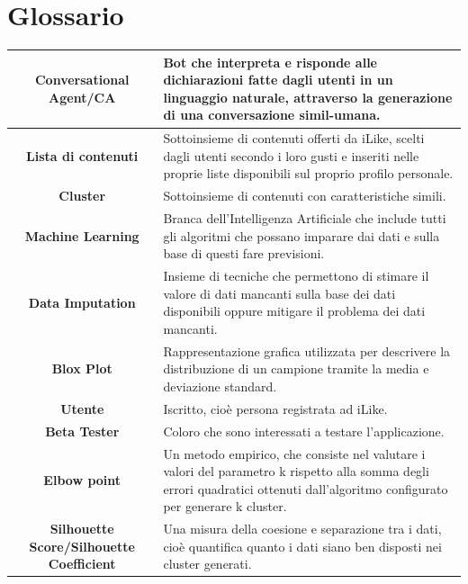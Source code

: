 \documentclass[a4paper, 10pt]{report}
\begin{document}
    \chapter{Glossario}\label{ch:glossario}
        \begin{adjustbox}{width=\columnwidth,center}
            \begin{tabular}{|>{\columncolor{Goldenrod}}c|p{8cm}|}
                \hline \textbf{Conversational Agent/CA} & Bot che interpreta e risponde alle dichiarazioni fatte dagli utenti
                        in un linguaggio naturale, attraverso la  generazione di una conversazione simil-umana.\\
                \hline \textbf{Lista di contenuti} & Sottoinsieme di contenuti offerti da iLike, scelti dagli utenti secondo i loro gusti
                        e inseriti nelle proprie liste disponibili sul proprio profilo personale.\\
                \hline \textbf{Cluster} & Sottoinsieme di contenuti con caratteristiche simili.\\
                \hline \textbf{Machine Learning} & Branca dell'Intelligenza Artificiale che include tutti gli algoritmi
                        che possano imparare dai dati e sulla base di questi fare previsioni.\\
                \hline \textbf{Data Imputation} & Insieme di tecniche che permettono di stimare il valore di dati mancanti
                        sulla base dei dati disponibili oppure mitigare il problema dei dati mancanti.\\
                \hline \textbf{Blox Plot} & Rappresentazione grafica utilizzata per descrivere la distribuzione di un campione
                        tramite la media e deviazione standard.\\
                \hline \textbf{Utente} & Iscritto, cioè persona registrata ad iLike.\\
                \hline \textbf{Beta Tester} & Coloro che sono interessati a testare l'applicazione.\\
                \hline \textbf{Elbow point} & Un metodo empirico, che consiste nel valutare i valori del parametro k
                        rispetto alla somma degli errori quadratici ottenuti dall’algoritmo
                        configurato per generare k cluster.\\
                \hline \textbf{Silhouette Score/Silhouette Coefficient} & Una misura della coesione e separazione tra i dati, cioè
                        quantifica quanto i dati siano ben disposti nei cluster generati.\\
                \hline
            \end{tabular}
        \end{adjustbox}
\end{document}
